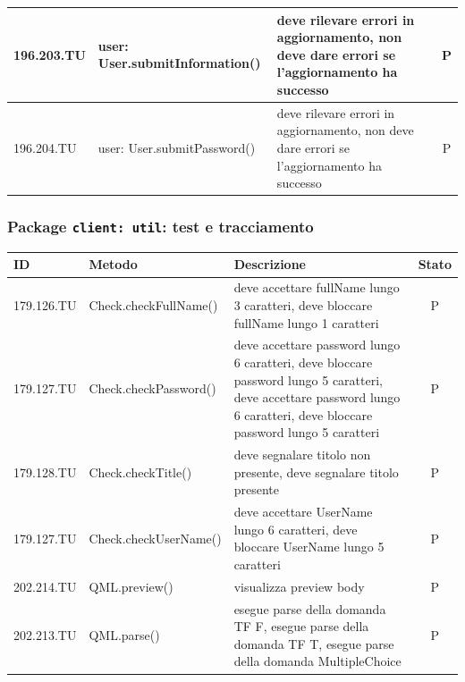 \documentclass[12pt,a4paper]{article}
\begin{document}
\begin{center}
\begin{longtable}[H]{l p{} p{} c}
		196.203.TU& user: \newline  User.submitInformation() & deve rilevare errori in aggiornamento, non deve dare errori se l'aggiornamento ha successo  & P\\ \midrule
		196.204.TU& user: \newline  User.submitPassword() & deve rilevare errori in aggiornamento, non deve dare errori se l'aggiornamento ha successo  & P\\ \midrule
		
	\end{longtable}
\end{center}

\subsubsection{Package \texttt{client: util}: test e tracciamento}
\begin{center}
	\begin{longtable}[H]{l p{} p{} c}\midrule
	\textbf{ID} & \textbf{Metodo} & \textbf{Descrizione} & \textbf{Stato}\\ \midrule
	\midrule		
	179.126.TU&  Check.checkFullName() & deve accettare fullName lungo 3 caratteri, deve bloccare fullName lungo 1 caratteri & P\\ \midrule
	179.127.TU&  Check.checkPassword() & deve accettare password lungo 6 caratteri, deve bloccare password lungo 5 caratteri, deve accettare password lungo 6 caratteri, deve bloccare password lungo 5 caratteri & P \\ \midrule
	179.128.TU&  Check.checkTitle() & deve segnalare titolo non presente, deve segnalare titolo presente & P \\ \midrule
	179.127.TU&  Check.checkUserName() & deve accettare UserName lungo 6 caratteri, deve bloccare UserName lungo 5 caratteri  & P\\ \midrule
	202.214.TU&  QML.preview() & visualizza preview body  & P\\ \midrule
	202.213.TU&  QML.parse() & esegue parse della domanda TF F, esegue parse della domanda TF T, esegue parse della domanda MultipleChoice  & P\\ \midrule

\end{longtable}
\end{center}
\end{document}
